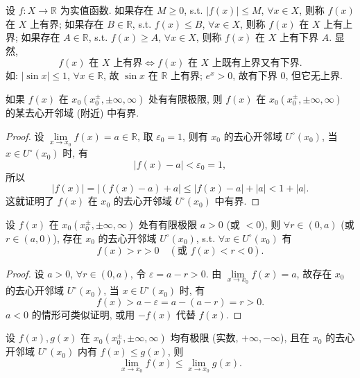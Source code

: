 \begin{definition}\label{def:2.2.1}
设 $f: X \to \mathbb{R}$ 为实值函数. 如果存在 $M \geqslant 0$, s.t. $|f(x)| \leqslant M$, $\forall x \in X$, 则称 $f(x)$ 在 $X$ 上有界; 如果存在 $B \in \mathbb{R}$, s.t. $f(x) \leqslant B$, $\forall x \in X$, 则称 $f(x)$ 在 $X$ 上有上界; 如果存在 $A \in \mathbb{R}$, s.t. $f(x) \geqslant A$, $\forall x \in X$, 则称 $f(x)$ 在 $X$ 上有下界 $A$. 显然,
\[
f(x) \text{ 在 } X \text{ 上有界} \iff f(x) \text{ 在 } X \text{ 上既有上界又有下界}.
\]
如: $|\sin x|\leqslant 1$, $\forall x\in\mathbb{R}$, 故 $\sin x$ 在 $\mathbb{R}$ 上有界; $e^{x}>0$, 故有下界 $0$, 但它无上界.
\end{definition}

\begin{theorem}[局部有界性]\label{thm:2.2.2}
如果 $f(x)$ 在 $x_{0}(x_{0}^{\pm}, \pm\infty, \infty)$ 处有有限极限, 则 $f(x)$ 在 $x_{0}(x_{0}^{\pm},\allowbreak \pm\infty,\allowbreak \infty)$ 的某去心开邻域 (附近) 中有界.
\end{theorem}

\begin{proof}
设 $\lim\limits_{x \to x_0} f(x) = a \in \mathbb{R}$, 取 $\varepsilon_0 = 1$, 则有 $x_0$ 的去心开邻域 $U^\circ(x_0)$, 当 $x \in U^\circ(x_0)$ 时, 有
\[
|f(x)-a|<\varepsilon_{0}=1,
\]
所以
\[
|f(x)|=|(f(x)-a)+a|\leqslant|f(x)-a|+|a|<1+|a|.
\]
这就证明了 $f(x)$ 在 $x_{0}$ 的去心开邻域 $U^{\circ}(x_{0})$ 中有界.
\end{proof}

\begin{theorem}[局部保号性]\label{thm:2.2.3}
设 $f(x)$ 在 $x_{0}(x_{0}^{\pm}, \pm\infty, \infty)$ 处有有限极限 $a > 0$ (或 $<0$), 则 $\forall r \in (0, a)$ (或 $r \in (a, 0)$), 存在 $x_{0}$ 的去心开邻域 $U^{\circ}(x_{0})$, s.t. $\forall x \in U^{\circ}(x_{0})$ 有
\[
f(x)>r>0 \quad (\text{或 } f(x)<r<0).
\]
\end{theorem}

\begin{proof}
设 $a > 0$, $\forall r \in (0, a)$, 令 $\varepsilon = a - r > 0$. 由 $\lim\limits_{x \to x_0} f(x) = a$, 故存在 $x_0$ 的去心开邻域 $U^\circ(x_0)$, 当 $x \in U^\circ(x_0)$ 时, 有
\[
f(x)>a-\varepsilon=a-(a-r)=r>0.
\]
$a<0$ 的情形可类似证明, 或用 $-f(x)$ 代替 $f(x)$.
\end{proof}

\begin{theorem}[保不等式性]\label{thm:2.2.4}
设 $f(x), g(x)$ 在 $x_{0}(x_{0}^{\pm}, \pm\infty, \infty)$ 均有极限 (实数, $+\infty, -\infty$), 且在 $x_{0}$ 的去心开邻域 $U^{\circ}(x_{0})$ 内有 $f(x) \leqslant g(x)$, 则
\[
\lim_{x\to x_{0}}f(x)\leqslant\lim_{x\to x_{0}}g(x).
\]
\end{theorem}

